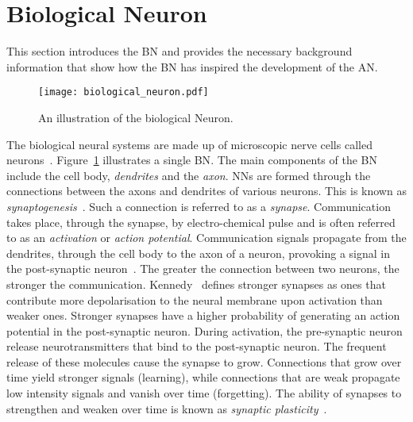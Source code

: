\section{Biological Neuron}\label{sec:anns:bn}

This section introduces the \acs{BN} and provides the necessary background information that show how the \acs{BN} has inspired the development of the \acs{AN}.

\begin{figure}[htb]
      \centering
      \texttt{[image: biological\_neuron.pdf]}
      \caption[The biological Neuron]{An illustration of the biological Neuron.}
      \label{fig:biological_neuron}
\end{figure}

The biological neural systems are made up of microscopic nerve cells called neurons~\cite{ref:jain:1996}. Figure~\ref{fig:biological_neuron} illustrates a single \acs{BN}. The main components of the \acs{BN} include the cell body, \textit{dendrites} and the \textit{axon}. \Acp{NN} are formed through the connections between the axons and dendrites of various neurons. This is known as \textit{synaptogenesis}~\cite{ref:huttenlocher:1997}. Such a connection is referred to as a \textit{synapse}. Communication takes place, through the synapse, by electro-chemical pulse and is often referred to as an \textit{activation} or \textit{action potential}.  Communication signals propagate from the dendrites, through the cell body to the axon of a neuron, provoking a signal in the post-synaptic neuron~\cite{ref:engelbrecht:2007}. The greater the connection between two neurons, the stronger the communication. Kennedy~\cite{ref:kennedy:2016} defines stronger synapses as ones that contribute more depolarisation to the neural membrane upon activation than weaker ones. Stronger synapses have a higher probability of generating an action potential in the post-synaptic neuron. During activation, the pre-synaptic neuron release neurotransmitters that bind to the post-synaptic neuron. The frequent release of these molecules cause the synapse to grow. Connections that grow over time yield stronger signals (learning), while connections that are weak propagate low intensity signals and vanish over time (forgetting). The ability of synapses to strengthen and weaken over time is known as \textit{synaptic plasticity}~\cite{ref:huttenlocher:1997}.

